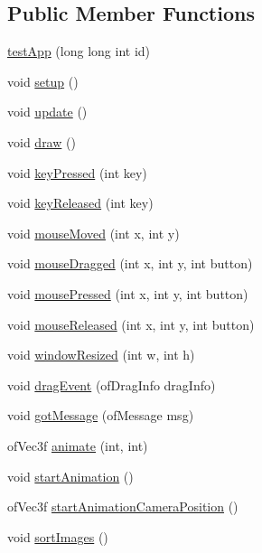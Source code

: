\subsection*{Public Member Functions}
\begin{DoxyCompactItemize}
\item 
\hyperlink{classtest_app_a3d796120bccff4106a3ec028b9a81912}{test\-App} (long long int id)
\item 
void \hyperlink{classtest_app_ad431db15b6150b965cd52bcba8e16e11}{setup} ()
\item 
void \hyperlink{classtest_app_afb39d201aec71a295b7609876bf7d0c6}{update} ()
\item 
void \hyperlink{classtest_app_af869cba67b1dab8481f8d0e216d59dcd}{draw} ()
\item 
void \hyperlink{classtest_app_a904d147c7e532cb92656d5dd4895cd26}{key\-Pressed} (int key)
\item 
void \hyperlink{classtest_app_a1116a10088e4932f6d482efe723cd45e}{key\-Released} (int key)
\item 
void \hyperlink{classtest_app_a33541b19eff9f8285b2487bfc146d58b}{mouse\-Moved} (int x, int y)
\item 
void \hyperlink{classtest_app_a075bcc2be16fd8f3eaa9162fb40a0a1f}{mouse\-Dragged} (int x, int y, int button)
\item 
void \hyperlink{classtest_app_a3f200702ce91859cac2872a39302679d}{mouse\-Pressed} (int x, int y, int button)
\item 
void \hyperlink{classtest_app_aa3680ffc782b1e5c451289817f20c9c6}{mouse\-Released} (int x, int y, int button)
\item 
void \hyperlink{classtest_app_a428b7df9c64352d6e7cb234fc297e6c9}{window\-Resized} (int w, int h)
\item 
void \hyperlink{classtest_app_af15e9e9064fe5ccbe6c82cc401ae9e09}{drag\-Event} (of\-Drag\-Info drag\-Info)
\item 
void \hyperlink{classtest_app_a66dbc8c5c2d4e20febebe9fd42b8c851}{got\-Message} (of\-Message msg)
\item 
of\-Vec3f \hyperlink{classtest_app_a1facfe2200dae7ad147b8f9ab31f68c6}{animate} (int, int)
\item 
void \hyperlink{classtest_app_a79467453f6ea0dd63961a810dca9ac6a}{start\-Animation} ()
\item 
of\-Vec3f \hyperlink{classtest_app_a1a97063e992528dc79867e516d9365f0}{start\-Animation\-Camera\-Position} ()
\item 
void \hyperlink{classtest_app_a8a5d9dd51b5c7058ed88611b6ab2b57d}{sort\-Images} ()

\end{DoxyCompactItemize}
